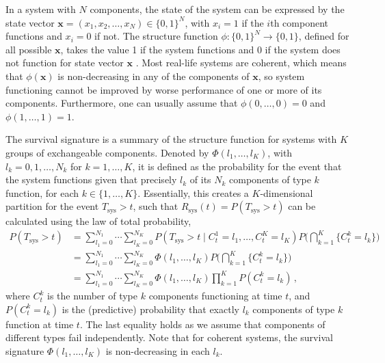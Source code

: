 \documentclass[authoryear]{elsarticle}
\renewcommand{\vec}[1]{{\bm#1}}
\newcommand{\Tsys}{T_\text{sys}}
\newcommand{\Rsys}{R_\text{sys}}
\begin{document}
In a system with $N$ components, the state of the system can be expressed by the state vector
$\vec{x} = (x_1,x_2,\ldots,x_N) \in \{0,1\}^N$,
with $x_i=1$ if the $i$th component functions and $x_i=0$ if not.
The structure function $\phi : \{0,1\}^N \rightarrow \{0,1\}$, defined for all possible $\vec{x}$,
takes the value 1 if the system functions and 0 if the system does not function for state vector $\vec{x}$ \citep{BP75}.
Most real-life systems are coherent,
which means that $\phi(\vec{x})$ is non-decreasing in any of the components of $\vec{x}$,
so system functioning cannot be improved by worse performance of one or more of its components.
Furthermore, one can usually assume that $\phi(0, \ldots, 0) = 0$ and $\phi(1, \ldots, 1) = 1$.

The survival signature \citep{2012:survsign} is a summary of the structure function
for systems with $K$ groups of exchangeable components.
Denoted by $\Phi(l_1,\ldots,l_K)$, with $l_k=0,1,\ldots,N_k$ for $k=1,\ldots,K$,
it is defined as the probability for the event that the system functions
given that precisely $l_k$ of its $N_k$ components of type $k$ function, for each $k\in \{1,\ldots,K\}$.
Essentially, this creates a $K$-dimensional partition for the event $\Tsys > t$,
such that $\Rsys(t) = P(\Tsys > t)$ can be calculated using the law of total probability,
\begin{align}
P(\Tsys > t) &= \sum_{l_1=0}^{N_1} \cdots \sum_{l_K=0}^{N_K} P(\Tsys > t \mid C^1_t = l_1,\ldots, C^K_t = l_K)
                                                                                  P\Big( \bigcap_{k=1}^K \{ C^k_t = l_k\} \Big) \nonumber\\
             &= \sum_{l_1=0}^{N_1} \cdots \sum_{l_K=0}^{N_K} \Phi(l_1,\ldots,l_K) P\Big( \bigcap_{k=1}^K \{ C^k_t = l_k\} \Big) \nonumber\\
             &= \sum_{l_1=0}^{N_1} \cdots \sum_{l_K=0}^{N_K} \Phi(l_1,\ldots,l_K) \prod_{k=1}^K P(C^k_t = l_k)\,,
\label{eq:sysrel-survsign}
\end{align}
where $C^k_t$ is the number of type $k$ components functioning at time $t$,
and $P(C^k_t = l_k)$ is the (predictive) probability that exactly $l_k$ components of type $k$ function at time $t$.
The last equality holds as we assume that components of different types fail independently.
Note that for coherent systems, the survival signature $\Phi(l_1,\ldots,l_K)$ is non-decreasing in each $l_k$.
\end{document}
